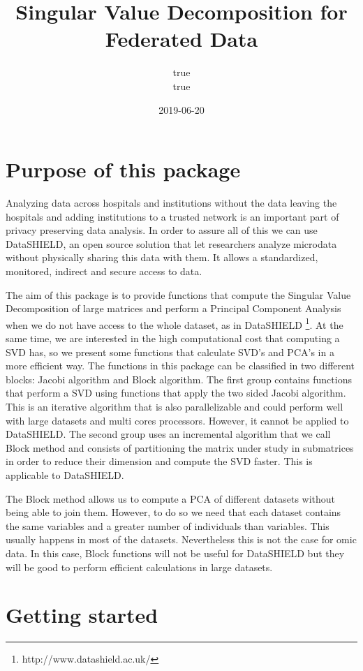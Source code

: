 \documentclass[]{article}
\title{Singular Value Decomposition for Federated Data}
\author{true \\ true}
\date{2019-06-20}
\let\rmarkdownfootnote\footnote%
\def\footnote{\protect\rmarkdownfootnote}
\begin{document}
\maketitle

\section{Purpose of this package}\label{purpose-of-this-package}

Analyzing data across hospitals and institutions without the data
leaving the hospitals and adding institutions to a trusted network is an
important part of privacy preserving data analysis. In order to assure
all of this we can use DataSHIELD, an open source solution that let
researchers analyze microdata without physically sharing this data with
them. It allows a standardized, monitored, indirect and secure access to
data.

The aim of this package is to provide functions that compute the
Singular Value Decomposition of large matrices and perform a Principal
Component Analysis when we do not have access to the whole dataset, as
in DataSHIELD \footnote{http://www.datashield.ac.uk/}. At the same time,
we are interested in the high computational cost that computing a SVD
has, so we present some functions that calculate SVD's and PCA's in a
more efficient way. The functions in this package can be classified in
two different blocks: Jacobi algorithm and Block algorithm. The first
group contains functions that perform a SVD using functions that apply
the two sided Jacobi algorithm. This is an iterative algorithm that is
also parallelizable and could perform well with large datasets and multi
cores processors. However, it cannot be applied to DataSHIELD. The
second group uses an incremental algorithm that we call Block method and
consists of partitioning the matrix under study in submatrices in order
to reduce their dimension and compute the SVD faster. This is applicable
to DataSHIELD.

The Block method allows us to compute a PCA of different datasets
without being able to join them. However, to do so we need that each
dataset contains the same variables and a greater number of individuals
than variables. This usually happens in most of the datasets.
Nevertheless this is not the case for omic data. In this case, Block
functions will not be useful for DataSHIELD but they will be good to
perform efficient calculations in large datasets.

\section{Getting started}\label{getting-started}
\end{document}
